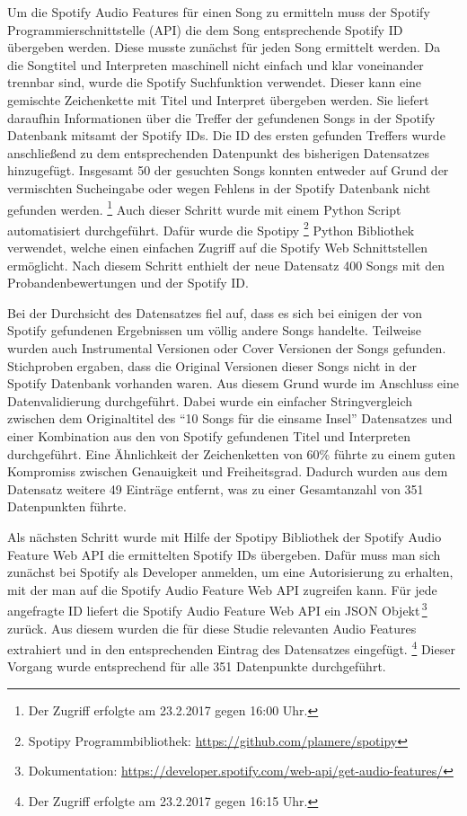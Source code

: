 Um die Spotify Audio Features für einen Song zu ermitteln muss der Spotify Programmierschnittstelle (API) die dem Song entsprechende Spotify ID übergeben werden.
Diese musste zunächst für jeden Song ermittelt werden.
Da die Songtitel und Interpreten maschinell nicht einfach und klar voneinander trennbar sind, wurde die Spotify Suchfunktion verwendet.
Dieser kann eine gemischte Zeichenkette mit Titel und Interpret übergeben werden.
Sie liefert daraufhin Informationen über die Treffer der gefundenen Songs in der Spotify Datenbank mitsamt der Spotify IDs.
Die ID des ersten gefunden Treffers wurde anschließend zu dem entsprechenden Datenpunkt des bisherigen Datensatzes hinzugefügt.
Insgesamt 50 der gesuchten Songs konnten entweder auf Grund der vermischten Sucheingabe oder wegen Fehlens in der Spotify Datenbank nicht gefunden werden.
\footnote{Der Zugriff erfolgte am 23.2.2017 gegen 16:00 Uhr.}
Auch dieser Schritt wurde mit einem Python Script automatisiert durchgeführt.
Dafür wurde die Spotipy \footnote{Spotipy Programmbibliothek: \url{https://github.com/plamere/spotipy}} Python Bibliothek verwendet, welche einen einfachen Zugriff auf die Spotify Web Schnittstellen ermöglicht.
Nach diesem Schritt enthielt der neue Datensatz 400 Songs mit den Probandenbewertungen und der Spotify ID.

Bei der Durchsicht des Datensatzes fiel auf, dass es sich bei einigen der von Spotify gefundenen Ergebnissen um völlig andere Songs handelte.
Teilweise wurden auch Instrumental Versionen oder Cover Versionen der Songs gefunden.
Stichproben ergaben, dass die Original Versionen dieser Songs nicht in der Spotify Datenbank vorhanden waren.
Aus diesem Grund wurde im Anschluss eine Datenvalidierung durchgeführt.
Dabei wurde ein einfacher Stringvergleich zwischen dem Originaltitel des "`10 Songs für die einsame Insel"' Datensatzes und einer Kombination aus den von Spotify gefundenen Titel und Interpreten durchgeführt.
Eine Ähnlichkeit der Zeichenketten von 60\% führte zu einem guten Kompromiss zwischen Genauigkeit und Freiheitsgrad.
Dadurch wurden aus dem Datensatz weitere 49 Einträge entfernt, was zu einer Gesamtanzahl von 351 Datenpunkten führte.

Als nächsten Schritt wurde mit Hilfe der Spotipy Bibliothek der Spotify Audio Feature Web API die ermittelten Spotify IDs übergeben.
Dafür muss man sich zunächst bei Spotify als Developer anmelden, um eine Autorisierung zu erhalten, mit der man auf die Spotify Audio Feature Web API zugreifen kann.
Für jede angefragte ID liefert die Spotify Audio Feature Web API ein JSON Objekt\,\footnote{Dokumentation: \url{https://developer.spotify.com/web-api/get-audio-features/}} zurück.
Aus diesem wurden die für diese Studie relevanten Audio Features extrahiert und in den entsprechenden Eintrag des Datensatzes eingefügt.
\footnote{Der Zugriff erfolgte am 23.2.2017 gegen 16:15 Uhr.}
Dieser Vorgang wurde entsprechend für alle 351 Datenpunkte durchgeführt.

